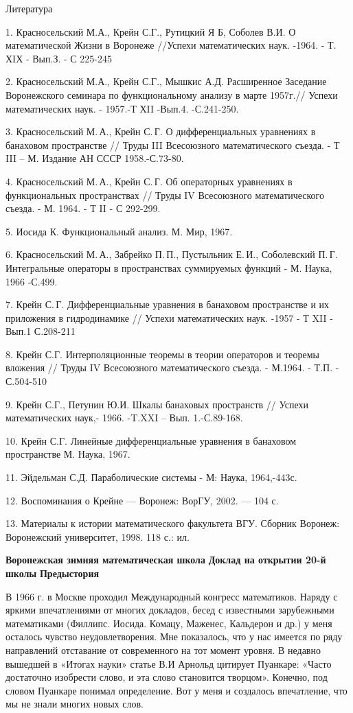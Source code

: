 Литература

1.	Красносельский М.А., Крейн С.Г., Рутицкий Я Б, Соболев В.И. О математической Жизни в Воронеже //Успехи математических наук. -1964. - Т. ХIХ - Вып.З. - С 225-245

2.	Красносельский М.А., Крейн С.Г., Мышкис А.Д. Расширенное Заседание Воронежского семинара по функциональному анализу в марте 1957г.// Успехи математических наук. - 1957.-Т ХII -Вып.4. -С.241-250.

3. Красносельский М.\,А., Крейн С.\,Г.
О дифференциальных уравнениях в банаховом пространстве // Труды III Всесоюзного математического съезда. - Т III – М.  Издание АН СССР 1958.-С.73-80.

4. Красносельский М.\,А., Крейн С.\,Г.
Об операторных уравнениях в функциональных пространствах // Труды IV Всесоюзного математического съезда. - М. 1964. - Т II - С 292-299.

5.	Иосида К. Функциональный анализ. М. Мир, 1967.

6.	Красносельский М.\,А., Забрейко П.\,П., Пустыльник Е.\,И., Соболевский П.\,Г.
Интегральные операторы в пространствах суммируемых функций - М. Наука, 1966 -С.499.

7. Крейн С.\,Г.
Дифференциальные уравнения в банаховом пространстве и их приложения в гидродинамике // Ус\-пе\-хи математических наук. -1957 - Т XII - Вып.1 С.208-211

8.	Крейн С.Г. Интерполяционные теоремы в теории операторов и теоремы вложения // Труды IV Всесоюзного математического съезда. - М.1964. - Т.П. - С.504-510

9.	Крейн С.Г., Петунин Ю.И. Шкалы банаховых пространств // Успехи математических наук,- 1966. -T.XXI – Вып. 1.-С.89-168.

10.	Крейн С.Г. Линейные дифференциальные уравнения в банаховом пространстве М. Наука, 1967.

11.	Эйдельман С.Д. Параболические системы - М: Наука, 1964,-443с.

12.	 Воспоминания о Крейне — Воронеж: ВорГУ, 2002. — 104 с.

13.	 Материалы к истории математического факультета ВГУ. Сборник  Воронеж:
Воронежский университет, 1998. 118 с.: ил.

{\bf Воронежская зимняя математическая школа}
{\bf Доклад на открытии 20-й школы}
{\bf Предыстория}

В 1966 г. в Москве проходил Международный конгресс математиков. Наряду с яркими впечатлениями от многих докладов, бесед с известными зарубежными математиками (Филлипс. Иосида. Комацу, Маженес, Кальдерон и др.) у меня осталось чувство неудовлетворения. Мне показалось, что у нас имеется по ряду направлений отставание от современного на тот момент уровня. В недавно вышедшей в «Итогах науки» статье В.И Арнольд цитирует Пуанкаре: «Часто достаточно изобрести слово, и эта слово становится творцом». Конечно, под словом Пуанкаре понимал определение. Вот у меня и создалось впечатление, что мы не знали многих новых слов.

